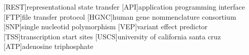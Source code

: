 \begin{acronym}
[REST]{representational state transfer}
[API]{application programming interface}
[FTP]{file transfer protocol}
[HGNC]{human gene nommenclature consortium}
[SNP]{single nucleotid polymorphism}
[VEP]{variant effect predictor}
[TSS]{transcription start sites}
[USCS]{university of california santa cruz}
[ATP]{adenosine triphosphate}
\end{acronym}
